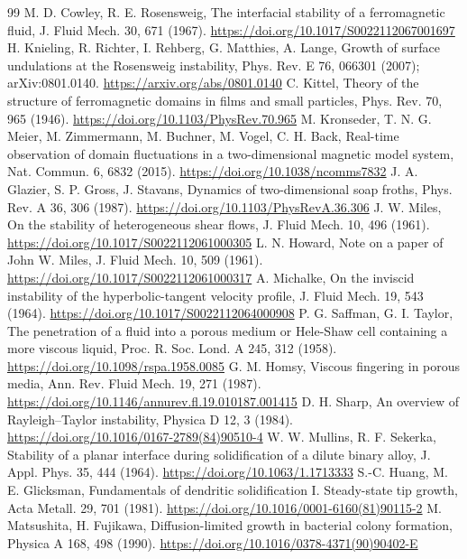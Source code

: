 \documentclass[11pt]{article}
\begin{document}
\begin{thebibliography}{99}
 M. D. Cowley, R. E. Rosensweig, The interfacial stability of a ferromagnetic fluid, J. Fluid Mech. 30, 671 (1967). \url{https://doi.org/10.1017/S0022112067001697}
 H. Knieling, R. Richter, I. Rehberg, G. Matthies, A. Lange, Growth of surface undulations at the Rosensweig instability, Phys. Rev. E 76, 066301 (2007); arXiv:0801.0140. \url{https://arxiv.org/abs/0801.0140}
 C. Kittel, Theory of the structure of ferromagnetic domains in films and small particles, Phys. Rev. 70, 965 (1946). \url{https://doi.org/10.1103/PhysRev.70.965}
 M. Kronseder, T. N. G. Meier, M. Zimmermann, M. Buchner, M. Vogel, C. H. Back, Real-time observation of domain fluctuations in a two-dimensional magnetic model system, Nat. Commun. 6, 6832 (2015). \url{https://doi.org/10.1038/ncomms7832}
 J. A. Glazier, S. P. Gross, J. Stavans, Dynamics of two-dimensional soap froths, Phys. Rev. A 36, 306 (1987). \url{https://doi.org/10.1103/PhysRevA.36.306}
 J. W. Miles, On the stability of heterogeneous shear flows, J. Fluid Mech. 10, 496 (1961). \url{https://doi.org/10.1017/S0022112061000305}
 L. N. Howard, Note on a paper of John W. Miles, J. Fluid Mech. 10, 509 (1961). \url{https://doi.org/10.1017/S0022112061000317}
 A. Michalke, On the inviscid instability of the hyperbolic-tangent velocity profile, J. Fluid Mech. 19, 543 (1964). \url{https://doi.org/10.1017/S0022112064000908}
 P. G. Saffman, G. I. Taylor, The penetration of a fluid into a porous medium or Hele-Shaw cell containing a more viscous liquid, Proc. R. Soc. Lond. A 245, 312 (1958). \url{https://doi.org/10.1098/rspa.1958.0085}
 G. M. Homsy, Viscous fingering in porous media, Ann. Rev. Fluid Mech. 19, 271 (1987). \url{https://doi.org/10.1146/annurev.fl.19.010187.001415}
 D. H. Sharp, An overview of Rayleigh–Taylor instability, Physica D 12, 3 (1984). \url{https://doi.org/10.1016/0167-2789(84)90510-4}
 W. W. Mullins, R. F. Sekerka, Stability of a planar interface during solidification of a dilute binary alloy, J. Appl. Phys. 35, 444 (1964). \url{https://doi.org/10.1063/1.1713333}
 S.-C. Huang, M. E. Glicksman, Fundamentals of dendritic solidification I. Steady-state tip growth, Acta Metall. 29, 701 (1981). \url{https://doi.org/10.1016/0001-6160(81)90115-2}
 M. Matsushita, H. Fujikawa, Diffusion-limited growth in bacterial colony formation, Physica A 168, 498 (1990). \url{https://doi.org/10.1016/0378-4371(90)90402-E}

\end{thebibliography}
\end{document}

